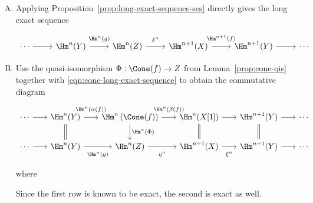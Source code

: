 \begin{enumerate}[(A)]
	\item Applying Proposition~\ref{prop:long-exact-sequence-ses} directly
	gives the long exact sequence
	\[\begin{tikzcd}
		\cdots \arrow[r] & \Hm^n(Y) \arrow[r, "{\Hm^n(g)}" inner sep=0.6em] & \Hm^n(Z) \arrow[r, "{\delta^n}" inner sep=0.6em] & \Hm^{n+1}(X) \arrow[r, "{\Hm^{n+1}(f)}" inner sep=0.6em] & \Hm^{n+1}(Y) \arrow[r] & \cdots
	\end{tikzcd}\]
	\item Use the quasi-isomorphism $\Phi:\Cone(f)\to Z$ from
	Lemma~\ref{prop:cone-qis} together with
	\eqref{eqn:cone-long-exact-sequence} to obtain the commutative diagram
	\[\begin{tikzcd}[column sep=scriptsize]
		\cdots \arrow[r] & \Hm^n(Y) \arrow[r, "{\Hm^n(\alpha(f))}" inner sep=0.6em] \arrow[equal, d] & \Hm^n\left( \Cone(f) \right) \arrow[r, "{\Hm^n(\beta(f))}" inner sep=0.6em] \arrow[d, "{\Hm^n(\Phi)}"] & \Hm^n(X[1]) \arrow[r] \arrow[equal, d] & \Hm^{n+1}(Y) \arrow[r] \arrow[equal, d] & \cdots \\
		\cdots \arrow[r] & \Hm^n(Y) \arrow[r, "{\Hm^n(g)}"' inner sep=0.6em] & \Hm^n(Z) \arrow[r, "{\eta^n}"' inner sep=0.6em] & \Hm^{n+1}(X) \arrow[r, "{\xi^n}"' inner sep=0.6em] & \Hm^{n+1}(Y) \arrow[r] & \cdots
	\end{tikzcd}\]
	where
	Since the first row is known to be exact, the second is exact as well.


\end{enumerate}
